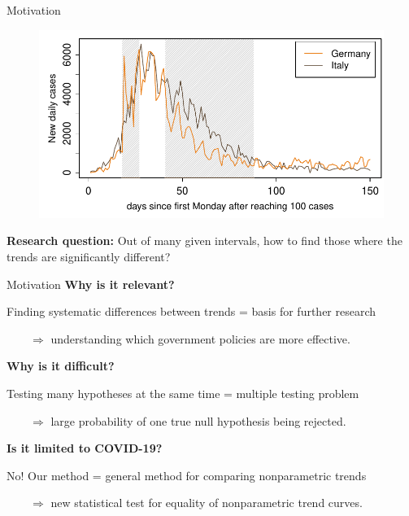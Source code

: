 \documentclass[10pt]{beamer}
\begin{document}
\begin{frame}{Motivation}
{\begin{figure}
  	\end{figure}}	
	{\onslide<4->
	\vspace{-46,81mm}
	\begin{figure}
    		\centering
    		\includegraphics[height=0.45\textheight]{plots/Germany_and_Italy_2.pdf}
  	\end{figure}}	
\vspace{-3mm}
{\textbf{Research question:}
	Out of many given intervals, how to find those where the trends are significantly different?}


\end{frame}

\begin{frame}{Motivation}
\vspace{-4mm}
\textbf{Why is it relevant?}

Finding systematic differences between trends = basis for further research

$\quad \quad \Rightarrow$ understanding which government policies are more effective.\pause

\vspace{3mm}

\textbf{Why is it difficult?}	

Testing many hypotheses at the same time = multiple testing problem

$\quad \quad \Rightarrow$ large probability of one true null hypothesis being rejected.\pause

\vspace{3mm}

\textbf{Is it limited to COVID-19?}

No! Our method = general method for comparing nonparametric trends

$\quad \quad \Rightarrow$ new statistical test for equality of nonparametric trend curves.
 
\end{frame}
\end{document}
